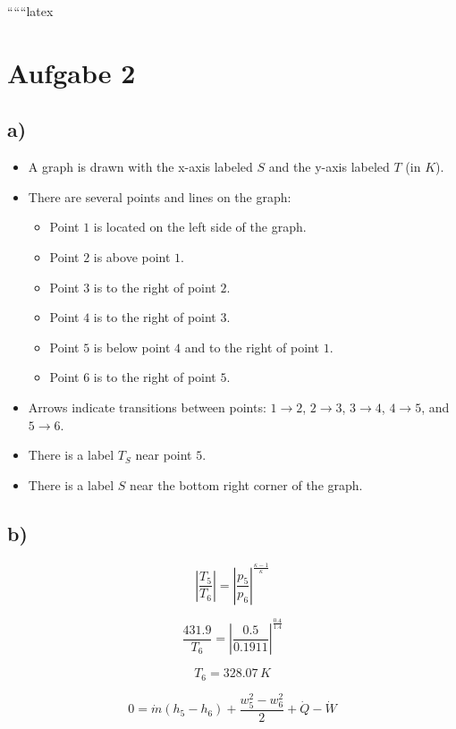 
``````latex


\section*{Aufgabe 2}

\subsection*{a)}

\begin{itemize}
    \item A graph is drawn with the x-axis labeled $S$ and the y-axis labeled $T$ (in $K$).
    \item There are several points and lines on the graph:
    \begin{itemize}
        \item Point $1$ is located on the left side of the graph.
        \item Point $2$ is above point $1$.
        \item Point $3$ is to the right of point $2$.
        \item Point $4$ is to the right of point $3$.
        \item Point $5$ is below point $4$ and to the right of point $1$.
        \item Point $6$ is to the right of point $5$.
    \end{itemize}
    \item Arrows indicate transitions between points: $1 \rightarrow 2$, $2 \rightarrow 3$, $3 \rightarrow 4$, $4 \rightarrow 5$, and $5 \rightarrow 6$.
    \item There is a label $T_S$ near point $5$.
    \item There is a label $S$ near the bottom right corner of the graph.
\end{itemize}

\subsection*{b)}

\[
\left| \frac{T_5}{T_6} \right| = \left| \frac{p_5}{p_6} \right|^{\frac{\kappa - 1}{\kappa}}
\]

\[
\frac{431.9}{T_6} = \left| \frac{0.5}{0.1911} \right|^{\frac{0.4}{1.4}}
\]

\[
T_6 = 328.07 \, K
\]

\[
0 = \dot{m} (h_5 - h_6) + \frac{w_5^2 - w_6^2}{2} + \dot{Q} - \dot{W}
\]

